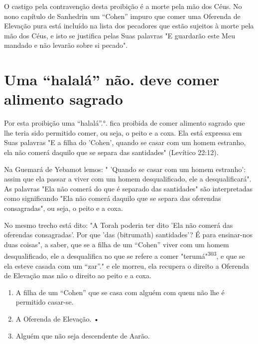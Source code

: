 O castigo pela contravenção desta proibição é a morte pela mão dos Céus.
No nono capítulo de Sanhedrin um ``Cohen'' impuro que comer uma Ofe­renda
de Elevação pura está incluído na lista dos pecadores que estão sujeitos
à morte pela mão dos Céus, e isto se justifica pelas Suas palavras "E
guardarão este Meu mandado e não levarão sobre si pecado".

\section{Uma ``halalá'' não. deve comer alimento sagrado}

Por esta proibição uma ``halalá''.°.
fica proibida de comer alimento sagrado que lhe teria sido permitido
comer, ou seja, o peito e a coxa. Ela está expressa em Suas palavras "E
a filha do 'Cohen', quando se casar com um ho­mem estranho, ela não
comerá daquilo que se separa das santidades" (Levítico 22:12).

Na Guemará de Yebamot lemos: " 'Quando se casar com um homem estranho':
assim que ela passar a viver com um homem desqualificado, ele a
desqualificará". As palavras "Ela não comerá do que é separado das
santida­des" são interpretadas como significando "Ela não comerá daquilo
que se se­para das oferendas consagradas", ou seja, o peito e a coxa.

No mesmo trecho está dito: "A Torah poderia ter dito 'Ela não co­merá
das oferendas consagradas'. Por que 'das (bitrumath) santidades'? É para
ensinar-nos duas coisas", a saber, que se a filha de um ``Cohen'' viver
com um homem desqualificado, ele a desqualifica no que se refere a comer
"teru­má"\textsuperscript{303}, e que se ela esteve casada com um
``zar''." e ele morreu, ela recupera o direito a
Oferenda de Elevação mas não o direito ao peito e a coxa.


\begin{enumerate}
\def\labelenumi{\arabic{enumi}.}
\setcounter{enumi}{301}
\item
 
 A filha de um ``Cohen'' que se casa com alguém com quem não lhe é
 permitido casar-se.
 
\item
 
 A Oferenda de Elevação. •
 
\item
 
 Alguém que não seja descendente de Aarão.
 
\end{enumerate}



